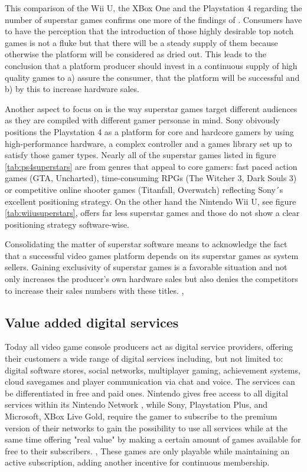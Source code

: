 \documentclass
[
    a4paper,
    11pt
]
{article}
\begin{document}
%
This comparison of the Wii U, the XBox One and the Playstation 4 regarding the number of superstar games confirms one more of the findings of \cite{Binken2009}. Consumers have to have the perception that the introduction of those highly desirable top notch games is not a fluke but that there will be a steady supply of them because otherwise the platform will be considered as dried out. This leads to the conclusion that a platform producer should invest in a continuous supply of high quality games to a) assure the consumer, that the platform will be successful and b) by this to increase hardware sales.

Another aspect to focus on is the way superstar games target different audiences
as they are compiled with different gamer personae in mind. Sony obivously positions
the Playstation 4 as a platform for core and hardcore gamers by using
 high-performance hardware, a complex controller and a games library set up to satisfy those gamer types.
Nearly all of the superstar games listed in figure \ref{tab:ps4superstars} are
from genres that appeal to core gamers: fast paced action games (GTA,
Uncharted), time-consuming RPGs (The Witcher 3, Dark Souls 3) or competitive
online shooter games (Titanfall, Overwatch) reflecting Sony´s excellent
positioning strategy. On the other hand the Nintendo Wii U, see figure
\ref{tab:wiiusuperstars}, offers far less superstar games and those do not show
a clear positioning strategy software-wise.

Consolidating the matter of superstar software means to acknowledge the fact
that a successful video games platform depends on
its superstar games as system sellers. Gaining exclusivity of superstar games
is a favorable situation and not only increases the producer's own hardware
sales but also denies the competitors to increase their sales numbers with these titles.
\cite{Shapiro1998}, \cite{Binken2009}
%
\subsection{Value added digital services}
\label{value-added-digital-services}
%
Today all video game console producers act as digital service providers, offering their customers
a wide range of digital services including, but not limited to: digital software stores, social
networks, multiplayer gaming, achievement systems, cloud savegames and player communication via chat and voice.
The services can be differentiated in free and paid ones. Nintendo gives free access to all
digital services within its Nintendo Network \cite{Nintendo2016a}, while Sony, Playstation Plus, and Microsoft,
XBox Live Gold, require the gamer to subscribe to the premium version of their networks to gain
the possibility to use all services while at the same time offering "real value"
by making a certain amount of games available for free to their subscribers.
\cite{PlaystationPlus2016}, \cite{XBoxLiveGold2016} These games are only playable
while maintaining an active subscription, adding another incentive for
continuous membership.
\end{document}

